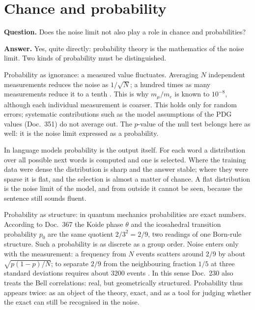 \section{Chance and probability}

\textbf{Question.} Does the noise limit not also play a role in chance and probabilities?

\textbf{Answer.} Yes, quite directly: probability theory is the mathematics of the noise limit. Two
kinds of probability must be distinguished.

Probability as ignorance: a measured value fluctuates. Averaging $N$ independent measurements reduces
the noise as $1/\sqrt N$; a hundred times as many measurements reduce it to a tenth \BM. This is why
$m_\mu/m_e$ is known to $10^{-8}$, although each individual measurement is coarser. This holds only
for random errors; systematic contributions such as the model assumptions of the PDG values
(Doc.~351) do not average out. The $p$-value of the null test belongs here as well: it is the noise
limit expressed as a probability.

In language models probability is the output itself. For each word a distribution over all possible
next words is computed and one is selected. Where the training data were dense the distribution is
sharp and the answer stable; where they were sparse it is flat, and the selection is almost a matter
of chance. A flat distribution is the noise limit of the model, and from outside it cannot be seen,
because the sentence still sounds fluent.

Probability as structure: in quantum mechanics probabilities are exact numbers. According to Doc.~367
the Koide phase $\theta$ and the icosahedral transition probability $p_0$ are the same quotient
$2/3^2=2/9$, two readings of one Born-rule structure. Such a probability is as discrete as a group
order. Noise enters only with the measurement: a frequency from $N$ events scatters around $2/9$ by
about $\sqrt{p(1-p)/N}$; to separate $2/9$ from the neighbouring fraction $1/5$ at three standard
deviations requires about 3200 events \KM. In this sense Doc.~230 also treats the Bell correlations:
real, but geometrically structured. Probability thus appears twice: as an object of the theory, exact,
and as a tool for judging whether the exact can still be recognised in the noise.

